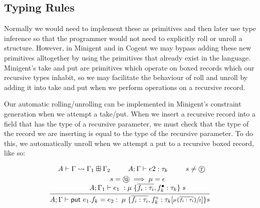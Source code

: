 \subsection{Typing Rules}


Normally we would need to implement these as primitives and then later use type inference so that
the programmer would not need to explicitly roll or unroll a structure. However,
in Minigent and in Cogent we may bypass adding these new primitives alltogether by using the primitives
that already exist in the language. Minigent's \textsf{take} and \textsf{put} are primitives which
operate on boxed records which our recursive types inhabit, so we may facilitate the behaviour
of roll and unroll by adding it into take and put when we perform operations on a recursive record.

Our automatic rolling/unrolling can be implemented in Minigent's constraint generation when we attempt a \textsf{take}/\textsf{put}.
When we insert a recursive record into a field that has the type of a recursive parameter, we must check that the type of the record
we are inserting is equal to the type of the recursive parameter. To do this, we automatically unroll
when we attempt a \textsf{put} to a recursive boxed record, like so: 

\begin{align*}
    \infer{
        A;\Gamma \vdash \textsf{put } e_1.f_k  = e_2 : \; \mu \; \{ \overline{f_i : \tau_i}, f_k^\circ : \tau_k[\sfrac{ \mu \{\overline{f_i : \tau_i} \}}{t}] \} s
    }{
        \begin{array}{c@{}c@{}c@{}c@{}c@{}}
            A \vdash \Gamma \rightsquigarrow \Gamma_1 \boxplus \Gamma_2 \hspace{2em}
            &
            A;\Gamma \vdash e2 : \tau_k \hspace{2em}
            &
            s \neq \text{\textcircled{r}}   \vspace{0.25em} \\
            &
            \hspace{-5em}s = \text{\textcircled{u}} \implies \mu = \epsilon \\
            &
            \hspace{-5em}A;\Gamma_1 \vdash e_1\; : \mu\; \{ \overline{f_i : \tau_i}, f_k^\bullet : \tau_k \}\; s 
        \end{array}
    }
\end{align*}

